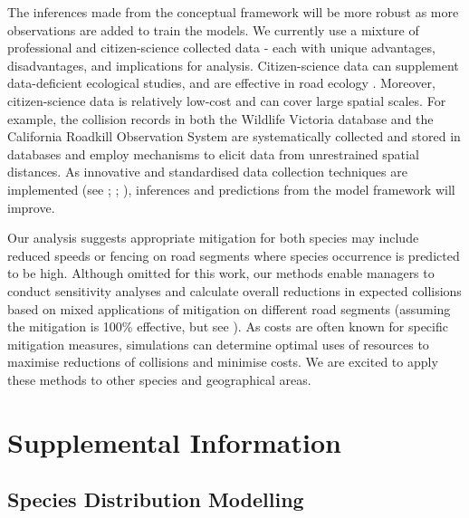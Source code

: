 The inferences made from the conceptual framework will be more robust as more observations are added to train the models.  We currently use a mixture of professional and citizen-science collected data - each with unique advantages, disadvantages, and implications for analysis.  Citizen-science data can supplement data-deficient ecological studies, and are effective in road ecology \citep{paul14}.  Moreover, citizen-science data is relatively low-cost and can cover large spatial scales.  For example, the collision records in both the Wildlife Victoria database and the California Roadkill Observation System are systematically collected and stored in databases and employ mechanisms to elicit data from unrestrained spatial distances.  As innovative and standardised data collection techniques are implemented (see \cite{aane09}; \cite{dona10}; \cite{shil15b}), inferences and predictions from the model framework will improve.

Our analysis suggests appropriate mitigation for both species may include reduced speeds or fencing on road segments where species occurrence is predicted to be high.  Although omitted for this work, our methods enable managers to conduct sensitivity analyses and calculate overall reductions in expected collisions based on mixed applications of mitigation on different road segments (assuming the mitigation is 100\% effective, but see \cite{huij09}).  As costs are often known for specific mitigation measures, simulations can determine optimal uses of resources to maximise reductions of collisions and minimise costs. We are excited to apply these methods to other species and geographical areas.

\section{Supplemental Information}\label{isec:occ}

\subsection{Species Distribution Modelling}

